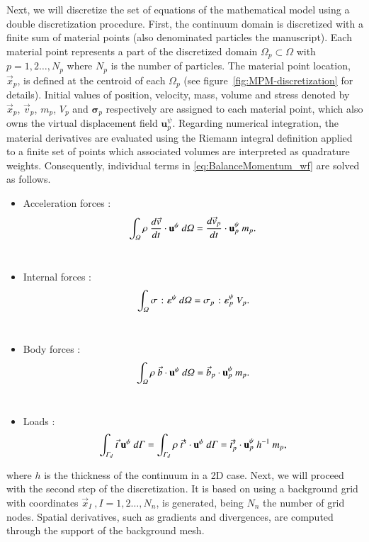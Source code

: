 \documentclass[preprint,12pt,a4paper]{elsarticle}
\newcommand{\vect}[1]{
  \ensuremath{\mathbf{{#1}}}
}
\newcommand{\tens}[1]{
  \ensuremath{\mathbf{{#1}}}
}
\newcommand{\Integral}[2]{
  \IfStrEqCase{#1}{
    {2}{\ensuremath{\int_{\varGamma_d}{#2}\ d\varGamma}}
    {3}{\ensuremath{\int_{\varOmega}{#2}\ d\varOmega}}
  }
}
\begin{document}
Next, we will discretize the set of equations of the mathematical model using a double discretization procedure. First, the continuum \gls{domain} is discretized with a finite sum of material points (also denominated particles the manuscript). Each material point
represents a part of the discretized domain $\varOmega_p \subset
\varOmega$ with $p = 1,2\ldots ,N_p$ where $N_p$ is the number of
particles. The material point location, $\vec{x}_p$, is defined at the centroid
of each $\Omega_p$ (see figure~\ref{fig:MPM-discretization} for details).
Initial values of position,
velocity, mass, volume and stress denoted by $\vec{x}_p$,
$\vec{v}_p$, $m_p$,  $V_p$ and $\tens{\sigma}_p$ respectively are assigned to each material point, which also owns the
virtual displacement field $\vect{u}^{\psi}_{p}$. Regarding numerical integration, the material derivatives are
  evaluated using the Riemann integral definition \cite{Riemann_1854}
  applied to a finite set of points which associated volumes are
  interpreted as quadrature weights. Consequently,
individual terms in \eqref{eq:BalanceMomentum_wf} are solved as follows. 
\begin{itemize}
\item Acceleration forces :
\begin{equation}
    \label{eq:particle_acceleration_forces}
    \Integral{3}{\rho\ \frac{d\vec{v}}{dt} \cdot \vect{u}^{\psi}} =
    \frac{d\vec{v}_{p}}{dt} \cdot \vect{u}^{\psi}_{p}\ m_p.
  \end{equation}\\
\item Internal forces :
  \begin{equation}
    \label{eq:particle_internal_forces}
    \Integral{3}{\tens{\sigma}\ \colon \tens{\varepsilon}^{\psi}} =
   \tens{\sigma}_{p}\ \colon \tens{\varepsilon}^{\psi}_p \ V_p.
  \end{equation}\\
\item Body forces :
\begin{equation}
  \label{eq:particle_body_forces}
  \Integral{3}{\rho\ \vec{b} \cdot \vect{u}^{\psi} } = 
  \vec{b}_{p} \cdot \vect{u}^{\psi}_p\ m_p.
\end{equation}\\
\item Loads :
\begin{equation}
  \begin{aligned}
    \label{eq:particle_load_forces}
    \Integral{2}{\vec{t}\ \vect{u}^{\psi}} = \Integral{2}{\rho\
      \vec{t}^s \cdot \vect{u}^{\psi}} = \vec{t}^s_{p} \cdot \vect{u}^{\psi}_{p}\ h^{-1}\ m_p ,
  \end{aligned} 
\end{equation}
\end{itemize}
where $h$ is the thickness of the continuum in a 2D case. Next, we
  will proceed with the second step of the discretization. It is based on using a background grid with coordinates $\vec{x}_I\
, I = 1,2\ldots ,N_n$, is generated, being $N_n$ the number of grid
nodes. Spatial derivatives, such as gradients and
divergences, are computed through the support of the background mesh.
\end{document}
